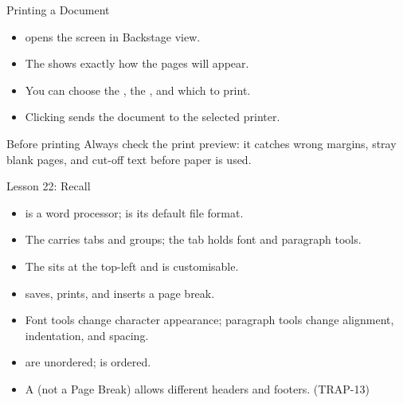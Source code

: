 \documentclass[aspectratio=169]{beamer}
\begin{document}
\begin{frame}{Printing a Document}
  \begin{itemize}
    \item {} opens the  screen in Backstage view.
    \item The  shows exactly how the pages will appear.
    \item You can choose the , the , and which
       to print.
    \item Clicking  sends the document to the selected printer.
  \end{itemize}
  \begin{block}{Before printing}
    Always check the print preview: it catches wrong margins, stray blank
    pages, and cut-off text before paper is used.
  \end{block}
\end{frame}

\begin{frame}{Lesson 22: Recall}
  \begin{itemize}
    \item {} is a word processor;  is its default file
      format.
    \item The  carries tabs and groups; the  tab holds
      font and paragraph tools.
    \item The  sits at the top-left and is
      customisable.
    \item {} saves,  prints, and 
      inserts a page break.
    \item Font tools change character appearance; paragraph tools change
      alignment, indentation, and spacing.
    \item {} are unordered;  is ordered.
    \item A  (not a Page Break) allows different headers
      and footers. (TRAP-13)
  \end{itemize}
\end{frame}
\end{document}
